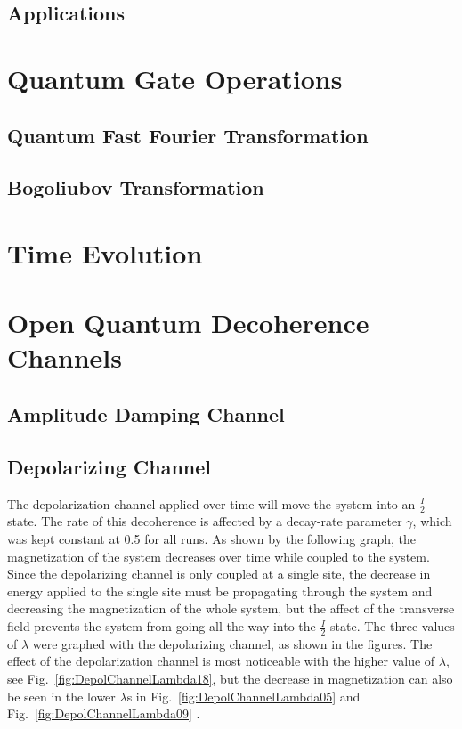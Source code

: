 \documentclass[12pt]{article}
\begin{document}
  \subsection{Applications}

  \section{Quantum Gate Operations}

  \subsection{Quantum Fast Fourier Transformation}

  \subsection{Bogoliubov Transformation}

  \section{Time Evolution}

  \section{Open Quantum Decoherence Channels}

  \subsection{Amplitude Damping Channel}

  \subsection{Depolarizing Channel}
The depolarization channel applied over time will move the system into an $\frac{I}{2}$ state. The rate of this decoherence is affected by a decay-rate parameter $\gamma$, which was kept constant at 0.5 for all runs. As shown by the following graph, the magnetization of the system decreases over time while coupled to the system. Since the depolarizing channel is only coupled at a single site, the decrease in energy applied to the single site must be propagating through the system and decreasing the magnetization of the whole system, but the affect of the transverse field prevents the system from going all the way into the $\frac{I}{2}$ state. The three values of $\lambda$ were graphed with the depolarizing channel, as shown in the figures. The effect of the depolarization channel is most noticeable with the higher value of $\lambda$, see Fig.~\ref{fig:DepolChannelLambda18},  but the decrease in magnetization can also be seen in the lower $\lambda$s in Fig.~\ref{fig:DepolChannelLambda05} and Fig.~\ref{fig:DepolChannelLambda09} .
\end{document}
